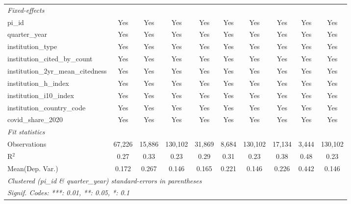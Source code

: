 \begin{tabular}{lccccccccc}
   \midrule
   \emph{Fixed-effects}\\
   pi\_id                                                      & Yes            & Yes           & Yes            & Yes            & Yes          & Yes            & Yes           & Yes           & Yes\\  
   quarter\_year                                               & Yes            & Yes           & Yes            & Yes            & Yes          & Yes            & Yes           & Yes           & Yes\\  
   institution\_type                                           & Yes            & Yes           & Yes            & Yes            & Yes          & Yes            & Yes           & Yes           & Yes\\  
   institution\_cited\_by\_count                               & Yes            & Yes           & Yes            & Yes            & Yes          & Yes            & Yes           & Yes           & Yes\\  
   institution\_2yr\_mean\_citedness                           & Yes            & Yes           & Yes            & Yes            & Yes          & Yes            & Yes           & Yes           & Yes\\  
   institution\_h\_index                                       & Yes            & Yes           & Yes            & Yes            & Yes          & Yes            & Yes           & Yes           & Yes\\  
   institution\_i10\_index                                     & Yes            & Yes           & Yes            & Yes            & Yes          & Yes            & Yes           & Yes           & Yes\\  
   institution\_country\_code                                  & Yes            & Yes           & Yes            & Yes            & Yes          & Yes            & Yes           & Yes           & Yes\\  
   covid\_share\_2020                                          & Yes            & Yes           & Yes            & Yes            & Yes          & Yes            & Yes           & Yes           & Yes\\  
   \midrule
   \emph{Fit statistics}\\
   Observations                                                & 67,226         & 15,886        & 130,102        & 31,869         & 8,684        & 130,102        & 17,134        & 3,444         & 130,102\\  
   R$^2$                                                       & 0.27           & 0.33          & 0.23           & 0.29           & 0.31         & 0.23           & 0.38          & 0.48          & 0.23\\  
Mean(Dep. Var.) & 0.172 & 0.267 & 0.146 & 0.165 & 0.221 & 0.146 & 0.226 & 0.442 & 0.146 \\
   \midrule \midrule
   \multicolumn{10}{l}{\emph{Clustered (pi\_id \& quarter\_year) standard-errors in parentheses}}\\
   \multicolumn{10}{l}{\emph{Signif. Codes: ***: 0.01, **: 0.05, *: 0.1}}\\
\end{tabular}
\par\endgroup
